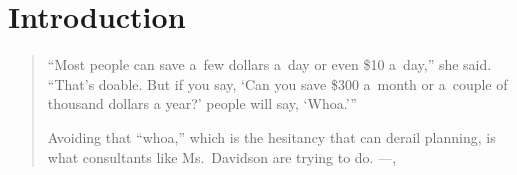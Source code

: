 


\renewcommand{\blindmarkup}[1]{\emph{#1}}
\blindmathfalse


\section{Introduction}
\label{sec:introduction}

\begin{quote}
	``Most people can save a~few dollars a~day or even \$10 a~day,'' she said. ``That’s doable. But if you say, `Can you save \$300 a~month or a~couple of thousand dollars a year?' people will say, `Whoa.'''
	
	Avoiding that ``whoa,'' which is the hesitancy that can derail planning, is what consultants like Ms.~Davidson are trying to do.
	\upshape
	\hspace{0pt}\hfill---\textit{},
\end{quote}

%
%
%
%
%

